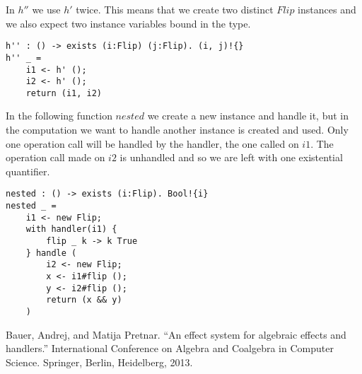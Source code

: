 \documentclass[12pt]{article}
\begin{document}
In $h''$ we use $h'$ twice. This means that we create two distinct $Flip$ instances and we also expect two instance variables bound in the type.
\begin{verbatim}
h'' : () -> exists (i:Flip) (j:Flip). (i, j)!{}
h'' _ =
	i1 <- h' ();
	i2 <- h' ();
	return (i1, i2)
\end{verbatim}

In the following function $nested$ we create a new instance and handle it, but in the computation we want to handle another instance is created and used. Only one operation call will be handled by the handler, the one called on $i1$. The operation call made on $i2$ is unhandled and so we are left with one existential quantifier.
\begin{verbatim}
nested : () -> exists (i:Flip). Bool!{i}
nested _ =
	i1 <- new Flip;
	with handler(i1) {
		flip _ k -> k True
	} handle (
		i2 <- new Flip;
		x <- i1#flip ();
		y <- i2#flip ();
		return (x && y)
	)
\end{verbatim}

\begin{thebibliography}{9}
Bauer, Andrej, and Matija Pretnar. ``An effect system for algebraic effects and handlers.'' International Conference on Algebra and Coalgebra in Computer Science. Springer, Berlin, Heidelberg, 2013.
\end{thebibliography}
\end{document}
